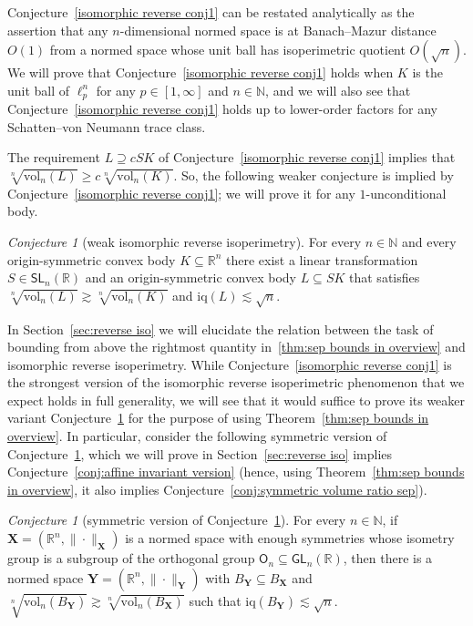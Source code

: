 \documentclass[11pt,reqno]{amsart}
\renewcommand{\ge}{\geqslant}
\newcommand{\X}{\mathbf X}
\newcommand{\Y}{\mathbf Y}
\newcommand{\R}{\mathbb R}
\theoremstyle{remark}
\newtheorem{conjecture}[theorem]{Conjecture}
\newcommand{\iq}{\mathrm{iq}}
\newcommand{\GL}{\mathsf{GL}}
\newcommand{\SL}{\mathsf{SL}}
\renewcommand{\supset}{\supseteq}
\renewcommand{\subset}{\subseteq}
\newcommand{\N}{\mathbb N}
\newcommand{\vol}{\mathrm{vol}}
\renewcommand{\1}{\mathbf 1}
\begin{document}
Conjecture~\ref{isomorphic reverse conj1} can be restated analytically as the assertion that any $n$-dimensional normed space is at Banach--Mazur distance $O(1)$ from a normed space whose unit ball has isoperimetric quotient $O(\sqrt{n})$. We will prove that Conjecture~\ref{isomorphic reverse conj1} holds when $K$ is the unit ball of $\ell_p^n$ for any $p\in [1,\infty]$ and $n\in \N$, and we will also see that Conjecture~\ref{isomorphic reverse conj1}  holds up to lower-order factors for any Schatten--von Neumann trace class.

The requirement $L\supset cSK$ of Conjecture~\ref{isomorphic reverse conj1} implies that $\sqrt[n]{\vol_n(L)}\ge c \sqrt[n]{\vol_n(K)}$. So, the following weaker conjecture is implied by Conjecture~\ref{isomorphic reverse conj1}; we will prove it for any $1$-unconditional body.

\begin{conjecture}[weak isomorphic reverse isoperimetry]\label{weak isomorphic reverse conj1} For every $n\in \N$ and every origin-symmetric convex body $K\subset \R^n$ there exist a linear transformation $S\in \SL_n(\R)$ and an origin-symmetric convex body $L\subset SK$ that satisfies $\sqrt[n]{\vol_n(L)}\gtrsim \sqrt[n]{\vol_n(K)}$ and $\iq(L)\lesssim\sqrt{n}$.
\end{conjecture}




In Section~\ref{sec:reverse iso} we will elucidate the relation between the task of  bounding from above the rightmost quantity in~\eqref{thm:sep bounds in overview} and isomorphic reverse isoperimetry. While Conjecture~\ref{isomorphic reverse conj1}  is the strongest version of the isomorphic reverse isoperimetric phenomenon that we expect holds in full generality, we will see that it would suffice to prove its weaker variant Conjecture~\ref{weak isomorphic reverse conj1} for the  purpose of using Theorem~\ref{thm:sep bounds in overview}. In particular, consider the following symmetric version of Conjecture~\ref{weak isomorphic reverse conj1}, which we will prove in Section~\ref{sec:reverse iso} implies Conjecture~\ref{conj:affine invariant version} (hence, using Theorem~\ref{thm:sep bounds in overview},  it also implies Conjecture~\ref{conj:symmetric volume ratio sep}).




\begin{conjecture}[symmetric version of Conjecture~\ref{weak isomorphic reverse conj1}]\label{weak isomorphic reverse conj1-symmetric} For every $n\in \N$, if $\X=(\R^n,\|\cdot\|_\X)$ is a normed space with enough symmetries whose isometry group is a subgroup of the orthogonal group $\mathsf{O}_n\subset \GL_n(\R)$, then there is a normed space $\Y=(\R^n,\|\cdot\|_\Y)$ with $B_\Y\subset B_\X$ and $\sqrt[n]{\vol_n(B_\Y)}\gtrsim \sqrt[n]{\vol_n(B_\X)}$ such that $\iq(B_\Y)\lesssim \sqrt{n}$.
\end{conjecture}
\end{document}
